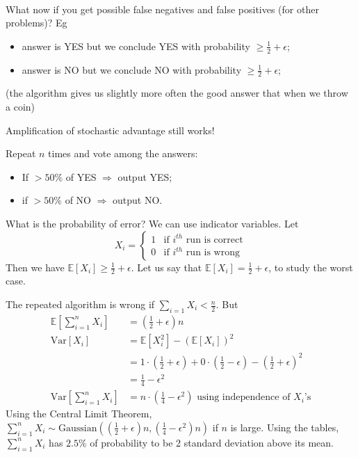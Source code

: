 \documentclass[11pt,a4paper]{scrartcl} %
\theoremstyle{definition}
\newcommand{\E}{\mathbb{E}}
\begin{document}
\begin{itemize}
	\paragraph{}
	
	What now if you get possible false negatives and false positives (for other problems)? Eg
	\begin{itemize}
		\item answer is YES but we conclude YES with probability $\geq \frac{1}{2}+\epsilon$;
		\item answer is NO but we conclude NO with probability $\geq \frac{1}{2}+\epsilon$;
	\end{itemize}
	(the algorithm gives us slightly more often the good answer that when we throw a coin)
	
	Amplification of stochastic advantage still works!

  Repeat $n$ times and vote among the answers:
	\begin{itemize}
		\item If $>50\%$ of YES $\Rightarrow$ output YES;
		\item if $>50\%$ of NO $\Rightarrow$ output NO.
	\end{itemize}
	What is the probability of error? We can use indicator variables. Let
	$$X_i=\left\{
	\begin{array}{ll}
       1&\text{if }i^{th}\text{ run is correct}\\
       0&\text{if }i^{th}\text{ run is wrong}
			\end{array}
  \right.
  $$
	Then we have $\E[X_i]\geq \frac{1}{2}+\epsilon$. Let us say that $\E[X_i]=\frac{1}{2}+\epsilon$, to study the worst case.
	
	The repeated algorithm is wrong if $\sum_{i=1}{X_i}<\frac{n}{2}$. But 
	\begin{align*}
	\E\left[\sum_{i=1}^n{X_i}\right]&=\left(\frac{1}{2}+\epsilon\right)n\\
	\mathrm{Var}\left[X_i\right] &= \E\left[X_i^2\right] - \left(\E[X_i]\right)^2\\
	&=1\cdot \left(\frac{1}{2}+\epsilon\right)+0\cdot \left(\frac{1}{2}-\epsilon\right) - \left(\frac{1}{2}+\epsilon\right)^2\\
	&=\frac{1}{4}-\epsilon^2\\
	\mathrm{Var}\left[\sum_{i=1}^n{X_i}\right]&=n\cdot \left(\frac{1}{4}-\epsilon^2\right)\text{ using independence of }X_i\text{'s}
	\end{align*} 
	Using the Central Limit Theorem, $\sum_{i=1}^n{X_i}\sim \text{Gaussian}\left( \left(\frac{1}{2}+\epsilon\right)n,\left(\frac{1}{4}-\epsilon^2\right)n \right)$ if $n$ is large. Using the tables, $\sum_{i=1}^n{X_i}$ has $2.5\%$ of probability to be 2 standard deviation above its mean.
	

\end{itemize}
\end{document}
